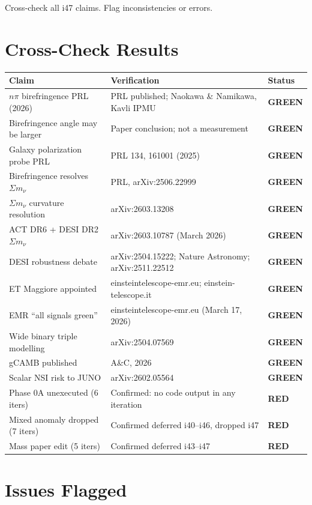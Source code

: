 \documentclass[11pt,a4paper]{article}
\newcommand{\GREEN}{\textcolor{dfdgreen}{\textbf{GREEN}}}
\newcommand{\RED}{\textcolor{dfdred}{\textbf{RED}}}
\begin{document}
Cross-check all i47 claims. Flag inconsistencies or errors.

\section{Cross-Check Results}

\begin{center}
\begin{tabular}{lp{7cm}l}
\toprule
\textbf{Claim} & \textbf{Verification} & \textbf{Status} \\
\midrule
$n\pi$ birefringence PRL (2026) & PRL published; Naokawa \& Namikawa, Kavli IPMU & \GREEN \\
Birefringence angle may be larger & Paper conclusion; not a measurement & \GREEN \\
Galaxy polarization probe PRL & PRL 134, 161001 (2025) & \GREEN \\
Birefringence resolves $\Sigma m_\nu$ & PRL, arXiv:2506.22999 & \GREEN \\
$\Sigma m_\nu$ curvature resolution & arXiv:2603.13208 & \GREEN \\
ACT DR6 + DESI DR2 $\Sigma m_\nu$ & arXiv:2603.10787 (March 2026) & \GREEN \\
DESI robustness debate & arXiv:2504.15222; Nature Astronomy; arXiv:2511.22512 & \GREEN \\
ET Maggiore appointed & einsteintelescope-emr.eu; einstein-telescope.it & \GREEN \\
EMR ``all signals green'' & einsteintelescope-emr.eu (March 17, 2026) & \GREEN \\
Wide binary triple modelling & arXiv:2504.07569 & \GREEN \\
gCAMB published & A\&C, 2026 & \GREEN \\
Scalar NSI risk to JUNO & arXiv:2602.05564 & \GREEN \\
Phase 0A unexecuted (6 iters) & Confirmed: no code output in any iteration & \RED \\
Mixed anomaly dropped (7 iters) & Confirmed deferred i40--i46, dropped i47 & \RED \\
Mass paper edit (5 iters) & Confirmed deferred i43--i47 & \RED \\
\bottomrule
\end{tabular}
\end{center}

\section{Issues Flagged}
\end{document}
